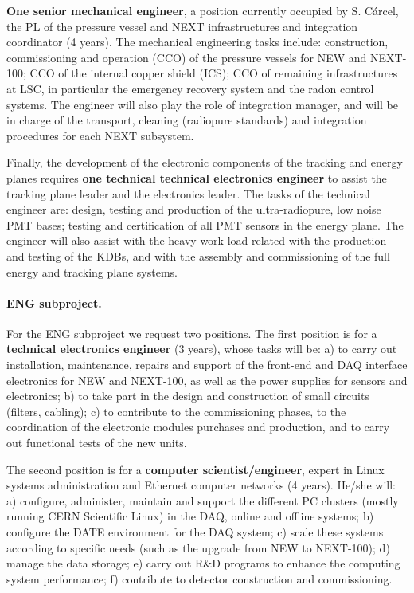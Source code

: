 {\bf One senior mechanical engineer}, a position currently occupied by S. Cárcel, the PL of the pressure vessel and NEXT infrastructures and integration coordinator (4 years). The mechanical engineering tasks include: construction, commissioning and operation (CCO) of the pressure vessels for NEW and NEXT-100; CCO of the internal copper shield (ICS); CCO of remaining infrastructures at LSC, in particular the emergency recovery system and the radon control systems. The engineer will also play the role of integration manager, and will be in charge of the transport, cleaning (radiopure standards) and integration procedures for each NEXT subsystem.

Finally, the development of the electronic components of the tracking and energy planes requires {\bf one technical technical electronics engineer} to assist the tracking plane leader and the electronics leader. The tasks of the technical engineer are: design, testing and production of the ultra-radiopure, low noise PMT bases; testing and certification of all PMT sensors in the energy plane. The engineer will also assist with the heavy work load related with the production and testing of the KDBs, and with the assembly and commissioning of the full energy and tracking plane systems.
\paragraph{ENG subproject.}

For the ENG subproject we request two positions. The first position is for a {\bf technical electronics engineer} (3 years), whose tasks will be: a) to carry out installation, maintenance, repairs and support of the front-end and DAQ interface electronics for NEW and NEXT-100, as well as the power supplies for sensors and electronics; b) to take part in the design and construction of small circuits (filters, cabling); c) to contribute to the commissioning phases, to the coordination of the electronic modules purchases and production, and to carry out functional tests of the new units. 

The second position is for a {\bf computer scientist/engineer}, expert in Linux systems administration and Ethernet computer networks (4 years). He/she will: a) configure, administer, maintain and support the different PC clusters (mostly running CERN Scientific Linux) in the DAQ, online and offline systems; b) configure the DATE environment for the DAQ system; c) scale these systems according to specific needs (such as the upgrade from NEW to NEXT-100); d) manage the data storage; e) carry out R\&D programs to enhance the computing system performance; f) contribute to detector construction and commissioning. 

